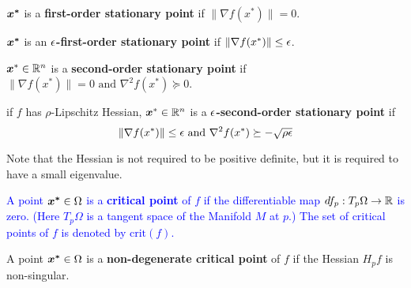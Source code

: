 \documentclass[10pt]{article}
\begin{document}
    \begin{definition}
        $\bm{x^*}$ is a \textbf{first-order stationary point}
        if $\| \nabla f(x^*) \| = 0$.
    \end{definition}

    \begin{definition}
        $\bm{x^*}$ is an \textbf{$\epsilon$-first-order stationary point} 
        if $\|\nabla f(x^*)\| \leq \epsilon$. 
    \end{definition}

    \begin{definition}
        $\bm{x}^* \in \mathbb{R}^n$ is a \textbf{second-order stationary point} if 
        $\| \nabla f(x^*) \| = 0\text{ and } \nabla^2 f(x^*) \succeq 0$.
    \end{definition}

    \begin{definition}
        if $f$ has $\rho$-Lipschitz Hessian, $\bm{x}^* \in \mathbb{R}^n$ is a
        \textbf{$\epsilon$-second-order stationary point} if 
        $$
            \| \nabla f(x^*) \| \leq \epsilon \text{ and }\nabla^2 f(x^*) \succeq -\sqrt{\rho \epsilon}
        $$
        \begin{remark}
            Note that the Hessian is not required to be positive definite, 
            but it is required to have a small eigenvalue. 
        \end{remark}
    \end{definition}


    \begin{definition}
        \textcolor{blue}{
            A point $\bm{x^*} \in \Omega$ is a \textbf{critical point} of $f$ if the
            differentiable map $df_p: T_p \Omega \rightarrow \mathbb{R}$ is zero. (Here
            $T_p \Omega$ is a tangent space of the Manifold $M$ at $p$.) 
            The set of critical points of $f$ is denoted by $\text{crit}(f)$.
        }
    \end{definition}

    \begin{definition}
        A point $\bm{x^*} \in \Omega$ is a \textbf{non-degenerate critical point} of $f$ if
        the Hessian $H_p f$ is non-singular.
    \end{definition}
\end{document}
